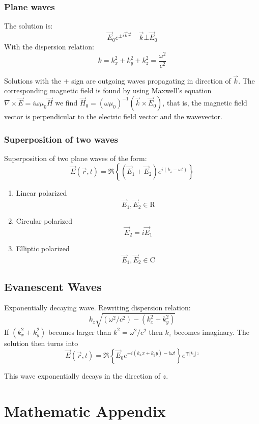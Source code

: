 \documentclass[a4paper, fontsize=8pt, landscape, DIV=1]{scrartcl}
\begin{document}
\begin{multicols*}{4}
  \subsubsection{Plane waves}
  The solution is:
  \[\vec{E}_0 e^{\pm i\vec{k}\vec{r}} \quad \vec{k}\bot\vec{E}_0\]
  With the dispersion relation:
  \[k = k_x^2+k_y^2+k_z^2 = \frac{\omega^2}{c^2}\]

  Solutions with the $+$ sign are outgoing waves propagating in direction of $\vec{k}$.
  The corresponding magnetic field is found by using Maxwell's equation $\nabla\times\vec{E} = i\omega\mu_0\vec{H}$ we find $\vec{H}_0=(\omega\mu_0)^{-1}(\vec{k}\times\vec{E}_0)$, that is, the magnetic field vector is perpendicular to the electric field vector and the wavevector.


  \subsubsection{Superposition of two waves}
  Superposition of two plane waves of the form:
  \[\vec{E}(\vec{r},t) = \Re\left\{(\vec{E}_1+\vec{E}_2) e^{i(k_z-\omega t)}\right\}\]
  \begin{enumerate}
    \item Linear polarized
      \[\vec{E}_1, \vec{E}_2 \in \mathrm{R}\]
    \item Circular polarized
      \[\vec{E}_2 = i\vec{E}_1\]
    \item Elliptic polarized
      \[\vec{E}_1, \vec{E}_2 \in \mathrm{C}\]
  \end{enumerate}

  \subsection{Evanescent Waves}
  Exponentially decaying wave. Rewriting dispersion relation:
  \[k_z \sqrt{(\omega^2/c^2)-(k_x^2+k_y^2)}\]
  If $(k_x^2+k_y^2)$ becomes larger than $k^2=\omega^2/c^2$ then $k_z$ becomes imaginary. The solution then turns into
  \[\vec{E}(\vec{r},t) = \Re\left\{ \vec{E}_0 e ^{\pm i(k_xx + k_yy)-i\omega t} \right\} e^{\mp|k_z|z}\]

  This wave exponentially decays in the direction of $z$.

  \vfill\null
  \pagebreak
  \section{Mathematic Appendix}

\end{multicols*}
\end{document}
